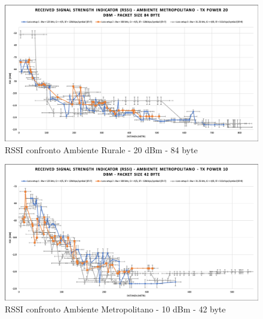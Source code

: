 \documentclass[12pt,a4paper,openright,twoside]{report}
\begin{document}
\begin{figure}[h]                      
\begin{center} 
\includegraphics[width=\textwidth]{RSSI_confronto_AR-20dBm-84byte.png}
\caption[RSSI confronto Ambiente Rurale - 20 dBm - 84 byte]{RSSI confronto Ambiente Rurale - 20 dBm - 84 byte}\label{fig:prima}
\end{center}
\end{figure}

\begin{figure}[h]                      
\begin{center} 
\includegraphics[width=\textwidth]{RSSI_confronto_AM-10dBm-42byte.png}
\caption[RSSI confronto Ambiente Metropolitano - 10 dBm - 42 byte]{RSSI confronto Ambiente Metropolitano - 10 dBm - 42 byte}\label{fig:prima}
\end{center}
\end{figure}
\end{document}
